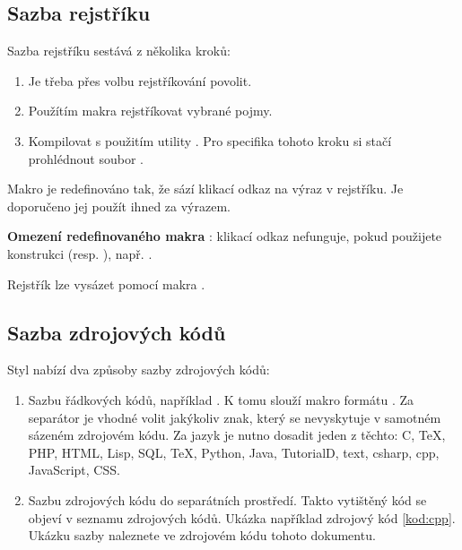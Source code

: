 \documentclass[
  biblatex,
  glossaries,
  index
]{kidiplom}
\begin{document}
\subsection{Sazba rejstříku}
Sazba rejstříku sestává z několika kroků:

\begin{enumerate}
\item Je třeba přes volbu  rejstříkování povolit.
\item Použítím makra  rejstříkovat vybrané pojmy.
\item Kompilovat s použitím utility . Pro specifika tohoto kroku si stačí prohlédnout soubor .
\end{enumerate}

Makro  je redefinováno tak, že sází klikací odkaz na výraz v rejstříku. Je doporučeno jej použít ihned za výrazem.

\textbf{Omezení redefinovaného makra }: klikací odkaz nefunguje, pokud použijete konstrukci  (resp. ), např. .

Rejstřík lze vysázet pomocí makra .

\subsection{Sazba zdrojových kódů}
Styl nabízí dva způsoby sazby zdrojových kódů:

\begin{enumerate}
\item Sazbu řádkových kódů, například . K tomu slouží makro formátu . Za separátor je vhodné volit jakýkoliv znak, který se nevyskytuje v samotném sázeném zdrojovém kódu. Za jazyk je nutno dosadit jeden z těchto: C, TeX, PHP, HTML, Lisp, SQL, TeX, Python, Java, TutorialD, text, csharp, cpp, JavaScript, CSS.

\item Sazbu zdrojových kódu do separátních prostředí. Takto vytištěný kód se objeví v seznamu zdrojových kódů. Ukázka například zdrojový kód \ref{kod:cpp}. Ukázku sazby naleznete ve zdrojovém kódu tohoto dokumentu.
\end{enumerate}
\end{document}
